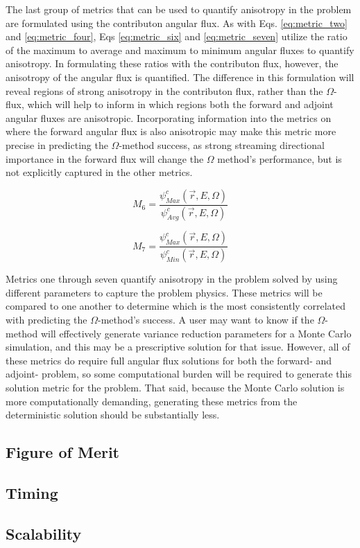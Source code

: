 The last group of metrics that can be used to quantify anisotropy in the problem
are formulated using the contributon angular flux. As with Eqs.
\ref{eq:metric_two} and \ref{eq:metric_four}, Eqs \ref{eq:metric_six} and
\ref{eq:metric_seven} utilize the ratio of the maximum to average and maximum to
minimum angular fluxes to quantify anisotropy. In formulating these ratios with
the contributon flux, however, the anisotropy of the angular flux is quantified.
The difference in this formulation  will reveal regions of strong anisotropy
in the contributon flux, rather than the $\Omega$-flux,
which will help to inform in which regions both the forward and adjoint angular
fluxes are anisotropic. Incorporating information into the metrics on where the
forward angular flux is also anisotropic may make this metric more precise in
predicting the $\Omega$-method success, as strong streaming directional
importance in the forward flux will change the $\Omega$ method's performance,
but is not explicitly captured in the other metrics.

\begin{equation}
  M_{6} = \frac{\psi^{c}_{Max}(\vec {r} ,E,\Omega)}{\psi^{c}_{Avg}(\vec {r}
                ,E,\Omega)}
  \label{eq:metric_six}
\end{equation}

\begin{equation}
  M_{7} = \frac{\psi^{c}_{Max}(\vec {r} ,E,\Omega)}{\psi^{c}_{Min}(\vec {r}
                ,E,\Omega)}
  \label{eq:metric_seven}
\end{equation}

Metrics one through seven quantify anisotropy
in the problem solved by using different parameters to capture the problem
physics. These metrics will be compared to one another to determine which is the
most consistently correlated with predicting the $\Omega$-method's success. A
user may want to know if the $\Omega$-method will effectively generate variance
reduction parameters for a Monte Carlo simulation, and this may be a
prescriptive solution for that issue. However, all of these metrics do require
full angular flux solutions for both the forward- and adjoint- problem, so some
computational burden will be required to generate this solution metric for the
problem. That said, because the Monte Carlo solution is more computationally
demanding, generating these metrics from the deterministic solution should be
substantially less.

\subsection{Figure of Merit}
\subsection{Timing}
\subsection{Scalability}
